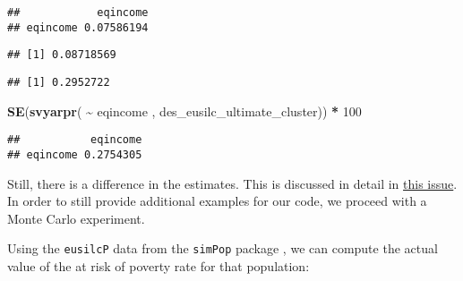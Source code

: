 \documentclass[
]{book}
\newenvironment{Shaded}{\begin{snugshade}}{\end{snugshade}}
\newcommand{\CommentTok}[1]{\textcolor[rgb]{0.56,0.35,0.01}{\textit{#1}}}
\newcommand{\DecValTok}[1]{\textcolor[rgb]{0.00,0.00,0.81}{#1}}
\newcommand{\FunctionTok}[1]{\textcolor[rgb]{0.13,0.29,0.53}{\textbf{#1}}}
\newcommand{\NormalTok}[1]{#1}
\newcommand{\SpecialCharTok}[1]{\textcolor[rgb]{0.81,0.36,0.00}{\textbf{#1}}}
\begin{document}
\begin{verbatim}
##            eqincome
## eqincome 0.07586194
\end{verbatim}

\begin{Shaded}
\end{Shaded}

\begin{verbatim}
## [1] 0.08718569
\end{verbatim}

\begin{Shaded}
\end{Shaded}

\begin{verbatim}
## [1] 0.2952722
\end{verbatim}

\begin{Shaded}
\begin{Highlighting}[]
\FunctionTok{SE}\NormalTok{(}\FunctionTok{svyarpr}\NormalTok{( }\SpecialCharTok{\textasciitilde{}}\NormalTok{ eqincome , des\_eusilc\_ultimate\_cluster)) }\SpecialCharTok{*} \DecValTok{100}
\end{Highlighting}
\end{Shaded}

\begin{verbatim}
##           eqincome
## eqincome 0.2754305
\end{verbatim}

Still, there is a difference in the estimates. This is discussed in detail in \href{https://github.com/ajdamico/convey/issues/372}{this issue}.
In order to still provide additional examples for our code, we proceed with a Monte Carlo experiment.

Using the \texttt{eusilcP} data from the \texttt{simPop} package \autocite{R-simPop}, we can compute the actual value of the at risk of poverty rate for that population:
\end{document}
